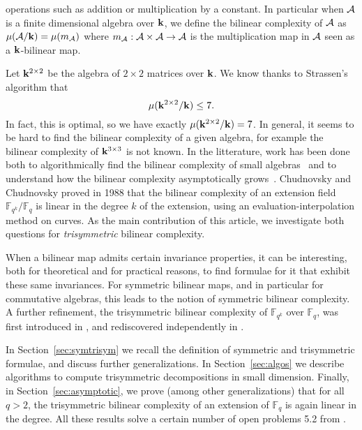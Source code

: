 \documentclass[11pt]{article}
\begin{document}
operations such as addition or multiplication by a constant.
In particular when $\mathcal{A}$ is a finite dimensional algebra over $\mathbf{k}$,
we define the bilinear complexity of $\mathcal{A}$ as $\mu(\mathcal{A}/\mathbf{k})=\mu(m_{\mathcal{A}})$
where $m_{\mathcal{A}}:\mathcal{A}\times\mathcal{A}\to\mathcal{A}$ is the multiplication map in $\mathcal{A}$ seen
as a $\mathbf{k}$-bilinear map. 

Let $\mathbf{k}^{2\times2}$ be the algebra
of $2\times2$ matrices over $\mathbf{k}$. We know thanks to Strassen's algorithm that 
\[
  \mu(\mathbf{k}^{2\times 2}/\mathbf{k}) \leq 7.
\]
In fact, this is optimal, so we have exactly $\mu(\mathbf{k}^{2\times2}/\mathbf{k})=7$. In
general, it seems to be hard to find the bilinear complexity of a given algebra,
for example the bilinear complexity of $\mathbf{k}^{3\times3}$ is not known.
In the litterature, work has been done both to algorithmically find the bilinear complexity of
small algebras~\cite{BDEZ12, Covanov19} and to understand how the bilinear
complexity asymptotically grows~\cite{CC88, BCPRRR19}. Chudnovsky and Chudnovsky
proved in 1988 that the bilinear complexity of an extension field
$\mathbb{F}_{q^k}/\mathbb{F}_{q}$ is linear in the degree $k$ of the
extension, using an evaluation-interpolation method on curves.
As the main contribution of this article, we
investigate both questions for \emph{trisymmetric} bilinear complexity.

When a bilinear map admits certain invariance properties, it can be interesting,
both for theoretical and for practical reasons,
to find formulae for it that exhibit these same invariances.
For symmetric bilinear maps, and in particular for commutative algebras, this leads to the notion of symmetric bilinear complexity.
A further refinement, the trisymmetric bilinear complexity of $\mathbb{F}_{q^k}$ over $\mathbb{F}_{q}$, was first introduced in \cite{SL84}, and rediscovered independently in \cite[App.~A]{Randriam15}.

In Section~\ref{sec:symtrisym} we recall the definition of symmetric and trisymmetric formulae, and discuss further generalizations. In Section~\ref{sec:algos} we
describe algorithms to compute trisymmetric decompositions in small dimension.
Finally, in
Section~\ref{sec:asymptotic}, we prove (among other generalizations) that for all $q>2$, the trisymmetric bilinear
complexity of an extension of $\mathbb{F}_q$ is again linear in the degree.
All these results solve a certain number of open problems 5.2 from \cite{BCPRRR19}.
\end{document}
